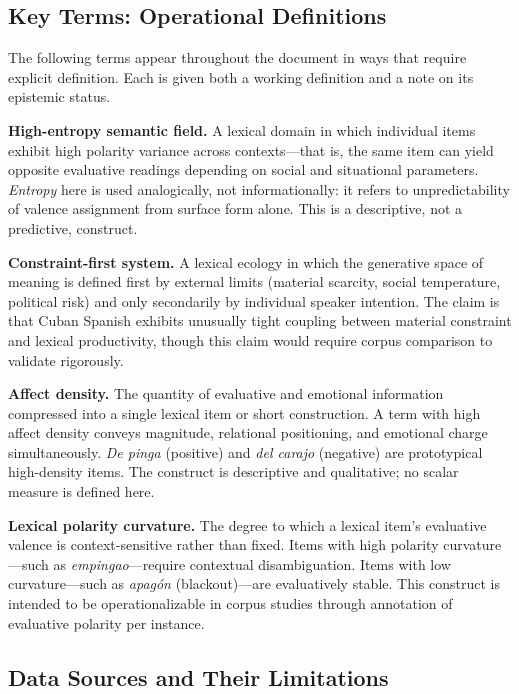 \documentclass[12pt]{article}
\begin{document}
\subsection*{Key Terms: Operational Definitions}

The following terms appear throughout the document in ways that require explicit definition. Each is given both a working definition and a note on its epistemic status.

\textbf{High-entropy semantic field.} A lexical domain in which individual items exhibit high polarity variance across contexts---that is, the same item can yield opposite evaluative readings depending on social and situational parameters. \textit{Entropy} here is used analogically, not informationally: it refers to unpredictability of valence assignment from surface form alone. This is a descriptive, not a predictive, construct.

\textbf{Constraint-first system.} A lexical ecology in which the generative space of meaning is defined first by external limits (material scarcity, social temperature, political risk) and only secondarily by individual speaker intention. The claim is that Cuban Spanish exhibits unusually tight coupling between material constraint and lexical productivity, though this claim would require corpus comparison to validate rigorously.

\textbf{Affect density.} The quantity of evaluative and emotional information compressed into a single lexical item or short construction. A term with high affect density conveys magnitude, relational positioning, and emotional charge simultaneously. \textit{De pinga} (positive) and \textit{del carajo} (negative) are prototypical high-density items. The construct is descriptive and qualitative; no scalar measure is defined here.

\textbf{Lexical polarity curvature.} The degree to which a lexical item's evaluative valence is context-sensitive rather than fixed. Items with high polarity curvature---such as \textit{empingao}---require contextual disambiguation. Items with low curvature---such as \textit{apagón} (blackout)---are evaluatively stable. This construct is intended to be operationalizable in corpus studies through annotation of evaluative polarity per instance.

\subsection*{Data Sources and Their Limitations}
\end{document}

